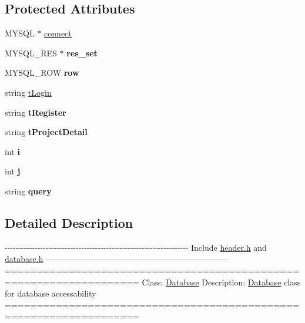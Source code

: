 \subsection*{Protected Attributes}
\begin{DoxyCompactItemize}
\item 
M\-Y\-S\-Q\-L $\ast$ \hyperlink{classDatabase_aa232b806b05ef654cd5579bca5f1dbad}{connect}
\item 
\hypertarget{classDatabase_ad5921cd2f70d0c22895f2cc5542ab4d7}{M\-Y\-S\-Q\-L\-\_\-\-R\-E\-S $\ast$ {\bfseries res\-\_\-set}}\label{classDatabase_ad5921cd2f70d0c22895f2cc5542ab4d7}

\item 
\hypertarget{classDatabase_a71ad7ae59677936d2ca6666f9de9df40}{M\-Y\-S\-Q\-L\-\_\-\-R\-O\-W {\bfseries row}}\label{classDatabase_a71ad7ae59677936d2ca6666f9de9df40}

\item 
string \hyperlink{classDatabase_acd64ff0e98b28cd1c6928a1236634521}{t\-Login}
\item 
\hypertarget{classDatabase_aa8ec817b6216079c8e541ec80c8bd4fa}{string {\bfseries t\-Register}}\label{classDatabase_aa8ec817b6216079c8e541ec80c8bd4fa}

\item 
\hypertarget{classDatabase_a62dd3ad69a4a07e66b412e276049ea48}{string {\bfseries t\-Project\-Detail}}\label{classDatabase_a62dd3ad69a4a07e66b412e276049ea48}

\item 
\hypertarget{classDatabase_a1b3174ab4ae9b3cb80448d48817375be}{int {\bfseries i}}\label{classDatabase_a1b3174ab4ae9b3cb80448d48817375be}

\item 
\hypertarget{classDatabase_a5b4fd605238ca66878959f5f3ba647f2}{int {\bfseries j}}\label{classDatabase_a5b4fd605238ca66878959f5f3ba647f2}

\item 
\hypertarget{classDatabase_a851daa5b233ce54d75873631b7b2167a}{string {\bfseries query}}\label{classDatabase_a851daa5b233ce54d75873631b7b2167a}

\end{DoxyCompactItemize}


\subsection{Detailed Description}
-\/-\/-\/-\/-\/-\/-\/-\/-\/-\/-\/-\/-\/-\/-\/-\/-\/-\/-\/-\/-\/-\/-\/-\/-\/-\/-\/-\/-\/-\/-\/-\/-\/-\/-\/-\/-\/-\/-\/-\/-\/-\/-\/-\/-\/-\/-\/-\/-\/-\/-\/-\/-\/-\/-\/-\/-\/-\/-\/-\/-\/-\/-\/-\/-\/-\/-\/ Include \hyperlink{header_8h_source}{header.\-h} and \hyperlink{database_8h_source}{database.\-h} ------------------------------------------------------------------ =================================================================== Class\-: \hyperlink{classDatabase}{Database} Description\-: \hyperlink{classDatabase}{Database} class for database accessability =================================================================== 

